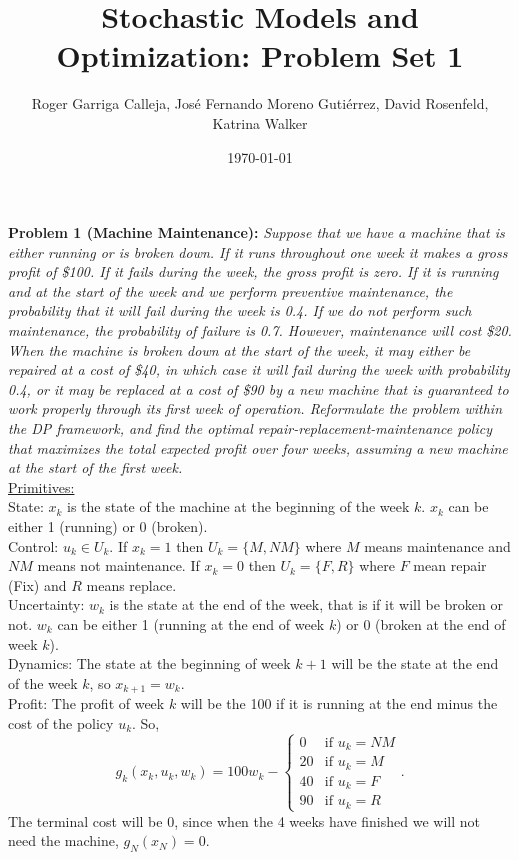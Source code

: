 \documentclass[11pt, english]{article}
\title{Stochastic Models and Optimization: Problem Set 1}
\author{Roger Garriga Calleja, José Fernando Moreno Gutiérrez, David Rosenfeld, Katrina Walker}
\date{\today}
\begin{document}
\maketitle

\textbf{Problem 1 (Machine Maintenance):}\textit{ Suppose that we have a machine that is either running or is broken down. If it runs throughout	one week it makes a gross profit of \$100. If it fails during the week, the gross profit is zero. If it is running and at the start of the week and we perform preventive maintenance, the probability that it will fail during the week is 0.4. If we do not perform such maintenance, the probability of failure is 0.7. However, maintenance will cost \$20. When the machine is broken down at the start of the week, it may either be repaired at a cost of \$40, in which case it will fail during the week with probability 0.4, or it may be replaced at a cost of \$90 by a new machine that is guaranteed to work properly through its first week of operation. Reformulate the problem within the DP framework, and find the optimal repair-replacement-maintenance policy that maximizes the total expected profit over four weeks, assuming a new machine at the start of the first week.}\\

\underline{Primitives:}\\
State: $x_k$ is the state of the machine at the beginning of the week $k$. $x_k$ can be either 1 (running) or 0 (broken).\\
Control: $u_k\in U_k$. If $x_k=1$ then $U_k=\{M,NM\}$ where $M$ means maintenance and $NM$ means not maintenance. If $x_k=0$ then $U_k=\{F,R\}$ where $F$ mean repair (Fix) and $R$ means replace.\\
Uncertainty: $w_k$ is the state at the end of the week, that is if it will be broken or not. $w_k$ can be either 1 (running at the end of week $k$) or 0 (broken at the end of week $k$).\\
Dynamics: The state at the beginning of week $k+1$ will be the state at the end of the week $k$, so $x_{k+1}=w_k$.\\
Profit: The profit of week $k$ will be the 100 if it is running at the end minus the cost of the policy $u_k$. So, $$g_k(x_k,u_k,w_k)=100w_k-\left\{\begin{array}{ll}
0 & \text{if }u_k=NM\\
20 & \text{if }u_k=M\\
40 & \text{if }u_k=F\\
90 & \text{if }u_k=R
\end{array}\right..$$
The terminal cost will be 0, since when the 4 weeks have finished we will not need the machine, $g_N(x_N)=0$.\\
\end{document}
